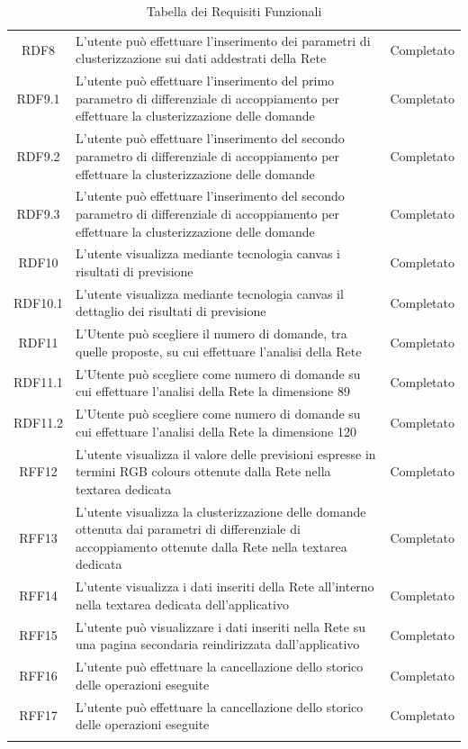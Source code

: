 \begin{longtable}{|c|p{7cm}|c|}
    RDF8 & L'utente pu\`o effettuare l'inserimento dei parametri di clusterizzazione sui dati addestrati della Rete & Completato \\
    RDF9.1 & L'utente pu\`o effettuare l'inserimento del primo parametro di differenziale di accoppiamento per effettuare la clusterizzazione delle domande  & Completato \\
   RDF9.2 & L'utente pu\`o effettuare l'inserimento del secondo parametro di differenziale di accoppiamento per effettuare la clusterizzazione delle domande  & Completato \\
		RDF9.3 & L'utente pu\`o effettuare l'inserimento del secondo parametro di differenziale di accoppiamento per effettuare la clusterizzazione delle domande  & Completato \\
    \hline 
    RDF10 & L'utente visualizza mediante tecnologia canvas i risultati di previsione & Completato \\
    RDF10.1 & L'utente visualizza mediante tecnologia canvas il dettaglio dei risultati di previsione & Completato \\
    RDF11 & L'Utente pu\`o scegliere il numero di domande, tra quelle proposte, su cui effettuare l'analisi della Rete & Completato \\
    RDF11.1 & L'Utente pu\`o scegliere come numero di domande su cui effettuare l'analisi della Rete la dimensione 89 & Completato \\
    RDF11.2 &  L'Utente pu\`o scegliere come numero di domande su cui effettuare l'analisi della Rete la dimensione 120 & Completato \\
    \hline
    RFF12 & L'utente visualizza il valore delle previsioni espresse in termini RGB colours ottenute dalla Rete nella textarea dedicata & Completato \\
    \hline
    RFF13 & L'utente visualizza la clusterizzazione delle domande ottenuta dai parametri di differenziale di accoppiamento ottenute dalla Rete nella textarea dedicata & Completato \\
    \hline 
     RFF14 & L'utente visualizza i dati inseriti della Rete all'interno nella textarea dedicata dell'applicativo & Completato \\
	   RFF15 & L'utente pu\`o visualizzare i dati inseriti nella Rete  su una pagina secondaria reindirizzata dall'applicativo & Completato \\
	   \hline
	  RFF16 & L'utente pu\`o effettuare la cancellazione dello storico delle operazioni eseguite & Completato \\
    \hline
    RFF17 & L'utente pu\`o effettuare la cancellazione dello storico delle operazioni eseguite & Completato \\
    \hline 
    
\caption{Tabella dei Requisiti Funzionali}\label{tab:requisiti funzionali funzionali}
\end{longtable}


